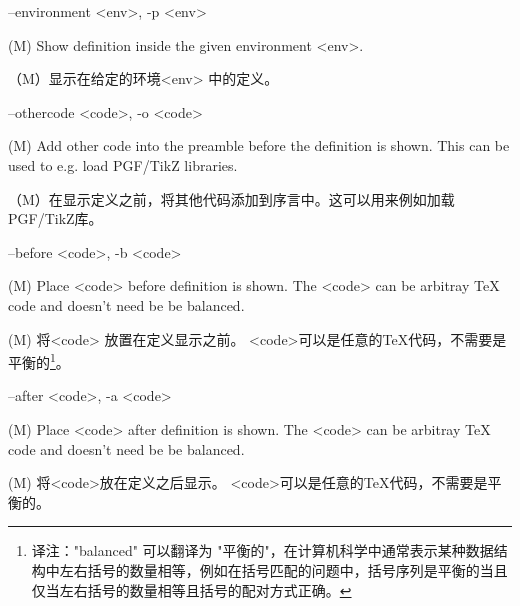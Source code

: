 \documentclass{article}
\newenvironment{options}{%
    \def\cstart{\begingroup\ttfamily\par\noindent\ignorespaces}%
    \def\csep{\endgroup\begingroup\list {}{}\item \relax}%
    \def\cend{\endlist\par\medskip\endgroup\cstart}%
    \cstart
}{%
    \endgroup
}
\begin{document}
\begin{options}
  --environment \MacroArgs<env>, -p \MacroArgs<env>  \csep 
(M) Show definition inside the given environment \MacroArgs<env>.

（M）显示在给定的环境\MacroArgs<env> 中的定义。
\cend
\end{options}

\begin{options}
  --othercode \MacroArgs<code>, -o \MacroArgs<code>  \csep
(M) Add other code into the preamble before the definition is shown.
This can be used to e.g. load PGF/TikZ libraries.

（M）在显示定义之前，将其他代码添加到序言中。这可以用来例如加载PGF/TikZ库。
  \cend
\end{options}

\begin{options}
  --before \MacroArgs<code>, -b \MacroArgs<code>     \csep 
(M) Place \MacroArgs<code> before definition is shown. 
The \MacroArgs<code> can be arbitray TeX code and doesn't need be be balanced.

(M) 将\MacroArgs <code> 放置在定义显示之前。 \MacroArgs <code>可以是任意的TeX代码，不需要是平衡的\footnote{译注："balanced" 可以翻译为 "平衡的"，在计算机科学中通常表示某种数据结构中左右括号的数量相等，例如在括号匹配的问题中，括号序列是平衡的当且仅当左右括号的数量相等且括号的配对方式正确。}。
\cend 
\end{options}


\begin{options}
  --after  \MacroArgs<code>, -a \MacroArgs<code>     \csep 
(M) 
Place \MacroArgs<code> after definition is shown.
  The \MacroArgs<code> can be arbitray TeX code and doesn't need be be balanced.
  
(M) 将\MacroArgs <code>放在定义之后显示。
\MacroArgs <code>可以是任意的TeX代码，不需要是平衡的。
\cend
\end{options}
\end{document}
